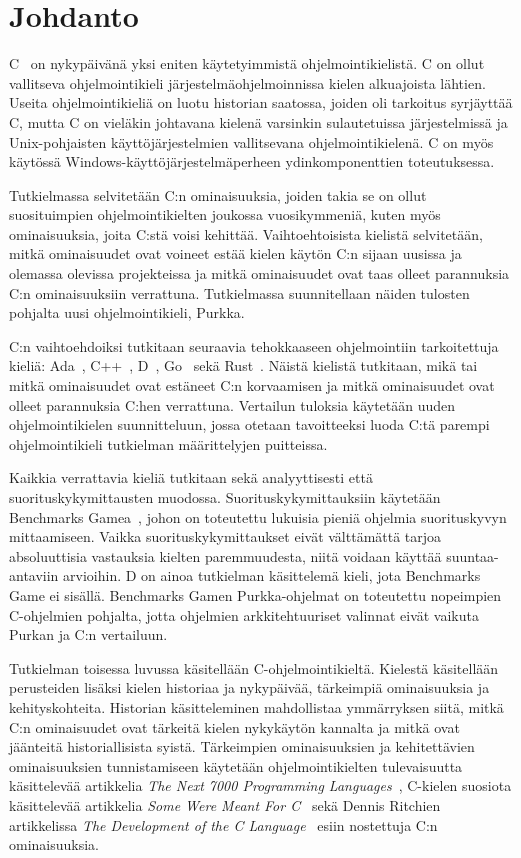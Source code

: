 \section{Johdanto}

C~\citep{C18} on nykypäivänä yksi eniten käytetyimmistä ohjelmointikielistä. C
on ollut vallitseva ohjelmointikieli järjestelmäohjelmoinnissa kielen
alkuajoista lähtien. Useita ohjelmointikieliä on luotu historian saatossa,
joiden oli tarkoitus syrjäyttää C, mutta C on vieläkin johtavana kielenä
varsinkin sulautetuissa järjestelmissä ja Unix-pohjaisten käyttöjärjestelmien
vallitsevana ohjelmointikielenä. C on myös käytössä
Windows-käyttöjärjestelmäperheen ydinkomponenttien toteutuksessa.

Tutkielmassa selvitetään C:n ominaisuuksia, joiden takia se on ollut
suosituimpien ohjelmointikielten joukossa vuosikymmeniä, kuten myös
ominaisuuksia, joita C:stä voisi kehittää. Vaihtoehtoisista kielistä
selvitetään, mitkä ominaisuudet ovat voineet estää kielen käytön C:n sijaan
uusissa ja olemassa olevissa projekteissa ja mitkä ominaisuudet ovat taas
olleet parannuksia C:n ominaisuuksiin verrattuna. Tutkielmassa suunnitellaan
näiden tulosten pohjalta uusi ohjelmointikieli, Purkka.

C:n vaihtoehdoiksi tutkitaan seuraavia tehokkaaseen ohjelmointiin tarkoitettuja
kieliä: Ada~\citep{ADA12}, C++~\citep{CPP17}, D~\citep{D}, Go~\citep{golang}
sekä Rust~\citep{rust}. Näistä kielistä tutkitaan, mikä tai mitkä ominaisuudet
ovat estäneet C:n korvaamisen ja mitkä ominaisuudet ovat olleet parannuksia
C:hen verrattuna. Vertailun tuloksia käytetään uuden ohjelmointikielen
suunnitteluun, jossa otetaan tavoitteeksi luoda C:tä parempi ohjelmointikieli
tutkielman määrittelyjen puitteissa.

Kaikkia verrattavia kieliä tutkitaan sekä analyyttisesti että
suorituskykymittausten muodossa. Suorituskykymittauksiin käytetään Benchmarks
Gamea~\citep{benchmarks}, johon on toteutettu lukuisia pieniä ohjelmia
suorituskyvyn mittaamiseen. Vaikka suorituskykymittaukset eivät välttämättä
tarjoa absoluuttisia vastauksia kielten paremmuudesta, niitä voidaan käyttää
suuntaa-antaviin arvioihin. D on ainoa tutkielman käsittelemä kieli, jota
Benchmarks Game ei sisällä. Benchmarks Gamen Purkka-ohjelmat on toteutettu
nopeimpien C-ohjelmien pohjalta, jotta ohjelmien arkkitehtuuriset valinnat
eivät vaikuta Purkan ja C:n vertailuun. 

Tutkielman toisessa luvussa käsitellään C-ohjelmointikieltä. Kielestä
käsitellään perusteiden lisäksi kielen historiaa ja nykypäivää, tärkeimpiä
ominaisuuksia ja kehityskohteita. Historian käsitteleminen mahdollistaa
ymmärryksen siitä, mitkä C:n ominaisuudet ovat tärkeitä kielen nykykäytön
kannalta ja mitkä ovat jäänteitä historiallisista syistä. Tärkeimpien
ominaisuuksien ja kehitettävien ominaisuuksien tunnistamiseen käytetään
ohjelmointikielten tulevaisuutta käsittelevää artikkelia \emph{The Next 7000
Programming Languages}~\citep{next7000}, C-kielen suosiota käsittelevää
artikkelia \emph{Some Were Meant For C}~\citep{somemeantforc} sekä Dennis
Ritchien artikkelissa \emph{The Development of the C Language}~\citep{chistory}
esiin nostettuja C:n ominaisuuksia.

